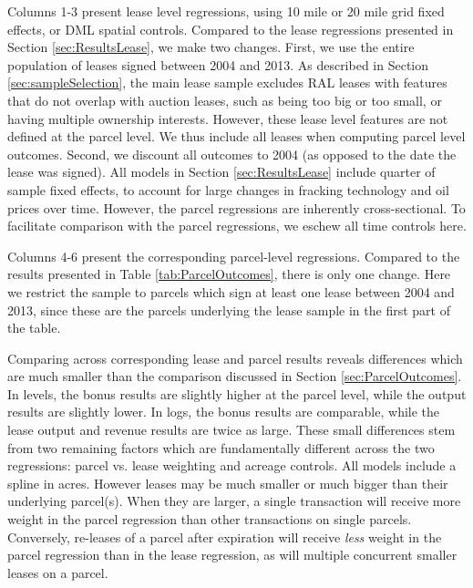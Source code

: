 \documentclass[12pt]{article}
\begin{document}
\begin{appendices}
Columns 1-3 present lease level regressions, using 10 mile or 20 mile grid fixed effects, or DML spatial controls. Compared to the lease regressions presented in Section \ref{sec:ResultsLease}, we make two changes. First, we use the entire population of leases signed between 2004 and 2013. As described in Section \ref{sec:sampleSelection}, the main lease sample excludes RAL leases with features that do not overlap with auction leases, such as being too big or too small, or having multiple ownership interests. However, these lease level features are not defined at the parcel level. We thus include all leases when computing parcel level outcomes. Second, we discount all outcomes to 2004 (as opposed to the date the lease was signed). All models in Section \ref{sec:ResultsLease} include quarter of sample fixed effects, to account for large changes in fracking technology and oil prices over time. However, the parcel regressions are inherently cross-sectional. To facilitate comparison with the parcel regressions, we eschew all time controls here. 

Columns 4-6 present the corresponding parcel-level regressions. Compared to the results presented in Table \ref{tab:ParcelOutcomes}, there is only one change. Here we restrict the sample to parcels which sign at least one lease between 2004 and 2013, since these are the parcels underlying the lease sample in the first part of the table. 

Comparing across corresponding lease and parcel results reveals differences which are much smaller than the comparison discussed in Section \ref{sec:ParcelOutcomes}. In levels, the bonus results are slightly higher at the parcel level, while the output results are slightly lower. In logs, the bonus results are comparable, while the lease output and revenue results are twice as large. These small differences stem from two remaining factors which are fundamentally different across the two regressions: parcel vs. lease weighting and acreage controls. All models include a spline in acres. However leases may be much smaller or much bigger than their underlying parcel(s). When they are larger, a single transaction will receive more weight in the parcel regression than other transactions on single parcels. Conversely, re-leases of a parcel after expiration will receive \textit{less} weight in the parcel regression than in the lease regression, as will multiple concurrent smaller leases on a parcel. 

\addtolength{\tabcolsep}{-7pt}


\end{appendices}
\end{document}
